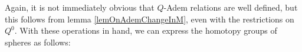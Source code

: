 \documentclass[10pt]{article}
\makeatletter
\newcommand{\produces}[3]{{#1}{#3}{#2}}
\renewcommand{\Q}{Q}
\newcommand{\minDim}{m}
\renewcommand{\produces}[3]{
{
\def\labelstyle{\scriptstyle}
\xymatrix@C=2em@1{
{#1}
\ar@{-}[r]|-{{\,#3\,}}
&%
{#2}%
}}}
\makeatother
\begin{document}
\begin{CategoriesOfInterest}
\noindent Again, it is not immediately obvious that $\Q$-Adem relations are well defined, but this follows from lemma \ref{lemOnAdemChangeInM}, even with the restrictions on $\Q^0$. 
With these operations in hand, we can express the homotopy groups of spheres as follows:






\end{CategoriesOfInterest}
\end{document}
